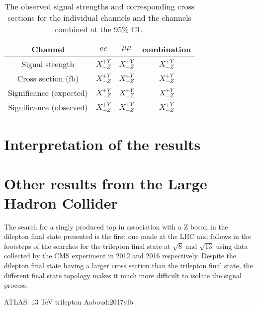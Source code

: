 \begin{table}[!h]
   \centering
   \caption{The observed signal strengths and corresponding cross sections for
   the individual channels and the channels combined at the 95\% CL.}
   \begin{tabular}{cccc}
       \hline
       Channel & $ee$ & $\mu\mu$ & \textbf{combination} \\
        \hline
        Signal strength & $X_{-Z}^{+Y}$ & $X_{-Z}^{+Y}$ & $X_{-Z}^{+Y}$ \\
       Cross section (fb) & $X_{-Z}^{+Y}$ & $X_{-Z}^{+Y}$ & $X_{-Z}^{+Y}$ \\
       Significance (expected) & $X_{-Z}^{+Y}$ & $X_{-Z}^{+Y}$ & $X_{-Z}^{+Y}$ \\
       Significance (observed) & $X_{-Z}^{+Y}$ & $X_{-Z}^{+Y}$ & $X_{-Z}^{+Y}$ \\
        \hline
    \end{tabular}
   \label{tab:shapetxs}
\end{table}

\section{Interpretation of the results}
\section{Other results from the Large Hadron Collider}
The search for a singly produced top in association with a Z boson in the dilepton final state presented is the first one made at the LHC and follows in the footsteps of the searches for the trilepton final state at $\sqrt{8}$ and $\sqrt{13}$ using data collected by the CMS experiment in 2012 and 2016 respectively.
Despite the dilepton final state having a larger cross section than the trilepton final state, the different final state topology makes it much more difficult to isolate the signal process.

ATLAS: 13 TeV trilepton Aaboud:2017ylb